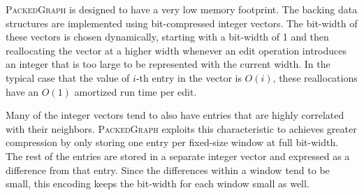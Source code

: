 \documentclass{bioinfo}
\begin{document}
\begin{methods}
\textsc{PackedGraph} is designed to have a very low memory footprint.
The backing data structures are implemented using bit-compressed integer vectors.
The bit-width of these vectors is chosen dynamically, starting with a bit-width of 1 and  then reallocating the vector at a higher width whenever an edit operation introduces an integer that is too large to be represented with the current width.
In the typical case that the value of $i$-th entry in the vector is $O(i)$, these reallocations have an  $O(1)$ amortized run time per edit.

Many of the integer vectors tend to also have entries that are highly correlated with their neighbors.
\textsc{PackedGraph} exploits this characteristic to achieves greater compression by only storing one entry per fixed-size window at full bit-width.
 The rest of the entries are stored in a separate integer vector and expressed as a difference from that entry.
 Since the differences within a window tend to be small, this encoding keeps the bit-width for each window small as well.


\end{methods}
\end{document}

